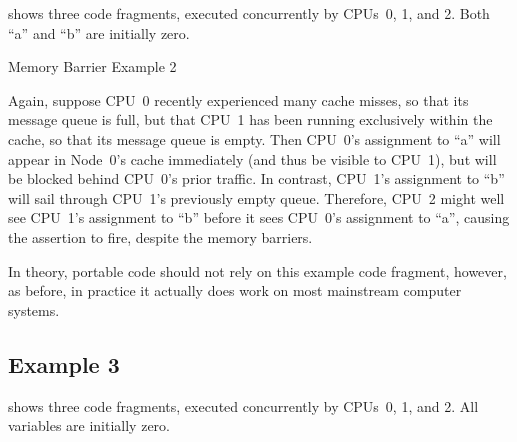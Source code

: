 shows three code fragments, executed concurrently by CPUs~0, 1, and 2.
Both ``a'' and ``b'' are initially zero.

\begin{listing}
\scriptsize
{}
\caption{Memory Barrier Example 2}
\label{lst:app:whymb:Memory Barrier Example 2}
\end{listing}

Again, suppose CPU~0 recently experienced many cache misses, so that its
message queue is full, but that CPU~1 has been running exclusively within
the cache, so that its message queue is empty.
Then CPU~0's assignment to ``a'' will appear in Node~0's cache
immediately (and thus be visible to CPU~1), but will be blocked behind
CPU~0's prior traffic.
In contrast, CPU~1's assignment to ``b'' will sail through CPU~1's
previously empty queue.
Therefore, CPU~2 might well see CPU~1's assignment to ``b'' before
it sees CPU~0's assignment to ``a'', causing the assertion to fire,
despite the memory barriers.

In theory, portable code should not rely on this example code fragment,
however, as before, in practice it actually does work on most
mainstream computer systems.

\subsection{Example 3}
\label{sec:app:whymb:Example 3}

shows three code fragments, executed concurrently by CPUs~0, 1, and 2.
All variables are initially zero.

